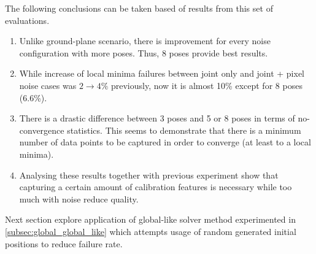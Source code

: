 \documentclass[english, printversion, nomenclature, notitle]{tuvisionthesis} %
\begin{document}
The following conclusions can be taken based of results from this set of evaluations.
\begin{enumerate}
	\item 
	Unlike ground-plane scenario, there is improvement for every noise configuration with more poses. Thus, 8 poses provide best results.
	\item
	While increase of local minima failures between joint only and joint + pixel noise cases was $2 \to 4\%$ previously, now it is almost 10\% except for 8 poses (6.6\%).
	\item 
	There is a drastic difference between 3 poses and 5 or 8 poses in terms of no-convergence statistics. This seems to demonstrate that there is a minimum number of data points to be captured in order to converge (at least to a local minima).
	\item 
	Analysing these results together with previous experiment show that capturing a certain amount of calibration features is necessary while too much with noise reduce quality.
\end{enumerate}

Next section explore application of global-like solver method experimented in \cref{subsec:global_global_like} which attempts usage of random generated initial positions to reduce failure rate.
\end{document}
